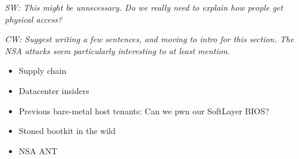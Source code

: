 {\em SW: This might be unnecessary. Do we really need to explain how people get
physical access? }

{\em CW: Suggest writing a few sentences, and moving to intro for this
section.  The NSA attacks seem particularly interesting to at least mention.}

\begin{itemize}
  \item Supply chain
  \item Datacenter insiders
  \item Previous bare-metal host tenants: Can we pwn our SoftLayer BIOS?
  \item Stoned bootkit in the wild
  \item NSA ANT
\end{itemize}
